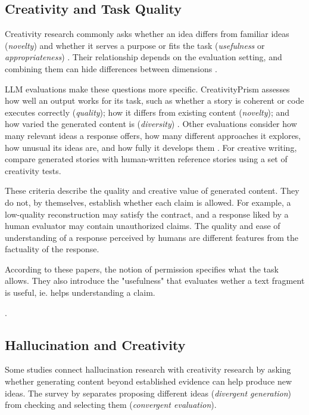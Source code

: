 \documentclass{clv2025}
\begin{document}
\subsection{Creativity and Task Quality}\label{subsec:creativity}

Creativity research commonly asks whether an idea differs from familiar
ideas (\emph{novelty}) and whether it serves a purpose or fits the task
(\emph{usefulness} or \emph{appropriateness})
\citep{runco_standard_2012,diedrich_are_2015}.
Their relationship depends on the evaluation setting, and combining them can
hide differences between dimensions \citep{pichot_reflective_2024}.

LLM evaluations make these questions more specific. CreativityPrism assesses
how well an output works for its task, such as whether a story is coherent
or code executes correctly (\emph{quality}); how it differs from existing
content (\emph{novelty}); and how varied the generated content is
(\emph{diversity}) \citep{hou_creativityprism_2025}.
Other evaluations consider how many relevant ideas a response offers, how
many different approaches it explores, how unusual its ideas are, and how
fully it develops them \citep{zhao_assessing_2025}. For creative writing,
\citet{li_automated_2025} compare generated stories with human-written
reference stories using a set of creativity tests.

These criteria describe the quality and creative value of generated content.
They do not, by themselves, establish whether each claim is allowed.
For example, a low-quality reconstruction may satisfy the contract, and a response liked by a human evaluator may contain unauthorized claims. The quality and ease of understanding of a response perceived by humans are different features from the factuality of the response.

According to these papers, the notion of permission specifies what the task allows. They also introduce the "usefulness" that evaluates wether a text fragment is useful, ie. helps understanding a claim.

 
\citep{wu_balancing_2025,gong_factuality_2026}.

\subsection{Hallucination and Creativity}

Some studies connect hallucination research with creativity research by
asking whether generating content beyond established evidence can help
produce new ideas. The survey by \citet{jiang_survey_2024} separates
proposing different ideas (\emph{divergent generation}) from checking and
selecting them (\emph{convergent evaluation}).
\end{document}

